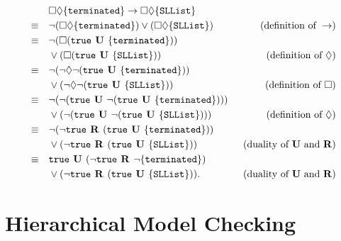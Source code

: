 \documentclass[a4paper, 12pt, twoside]{report}
\begin{document}
	\begin{align*}
		&\square \lozenge \{\texttt{terminated}\} \rightarrow \square \lozenge \{\texttt{SLList}\} \\
		\equiv \quad &\neg(\square \lozenge \{\texttt{terminated}\}) \vee (\square \lozenge \{\texttt{SLList}\}) \qquad &(\text{definition of } \rightarrow) \\
		\equiv \quad &\neg(\square (\text{\texttt{true}} \text{\textbf{ U }} \{\texttt{terminated}\})) \\&\vee (\square (\text{\texttt{true}} \text{\textbf{ U }} \{\texttt{SLList}\})) \qquad &(\text{definition of } \lozenge) \\
		\equiv \quad &\neg(\neg\lozenge\neg (\text{\texttt{true}} \text{\textbf{ U }} \{\texttt{terminated}\}))\\ &\vee (\neg\lozenge\neg (\text{\texttt{true}} \text{\textbf{ U }} \{\texttt{SLList}\})) \qquad &(\text{definition of } \square) \\
		\equiv \quad &\neg(\neg(\text{\texttt{true}}  \text{\textbf{ U }} \neg (\text{\texttt{true}} \text{\textbf{ U }} \{\texttt{terminated}\})))\\ &\vee (\neg(\text{\texttt{true}} \text{\textbf{ U }} \neg (\text{\texttt{true}} \text{\textbf{ U }} \{\texttt{SLList}\}))) \qquad &(\text{definition of } \lozenge) \\
		\equiv \quad &\neg(\neg\text{\texttt{true}}  \text{\textbf{ R }} (\text{\texttt{true}} \text{\textbf{ U }} \{\texttt{terminated}\}))\\ &\vee (\neg\text{\texttt{true}} \text{\textbf{ R }} (\text{\texttt{true}} \text{\textbf{ U }} \{\texttt{SLList}\})) \qquad &(\text{duality of } \text{\textbf{U}} \text{ and } \text{\textbf{R}}) \\
		\equiv \quad &\text{\texttt{true}}  \text{\textbf{ U }} (\neg\text{\texttt{true}} \text{\textbf{ R }} \neg\{\texttt{terminated}\}) \\&\vee (\neg\text{\texttt{true}} \text{\textbf{ R }} (\text{\texttt{true}} \text{\textbf{ U }} \{\texttt{SLList}\})). \qquad &(\text{duality of } \text{\textbf{U}} \text{  and } \text{\textbf{R}}) \\
	\end{align*}	
	
	\chapter{Hierarchical Model Checking}\label{chp:tableaux}
	
\end{document}

